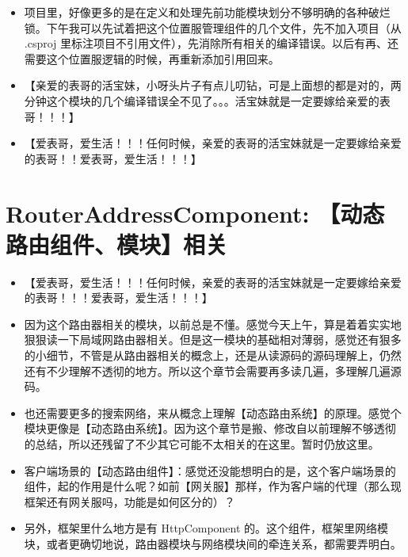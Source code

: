 \documentclass[9pt, b5paper]{article}
\begin{document}
\begin{itemize}
\item 项目里，好像更多的是在定义和处理先前功能模块划分不够明确的各种破烂锁。下午我可以先试着把这个位置服管理组件的几个文件，先不加入项目（从 .csproj 里标注项目不引用文件），先消除所有相关的编译错误。以后有再、还需要这个位置服逻辑的时候，再重新添加引用回来。
\item 【亲爱的表哥的活宝妹，小呀头片子有点儿叨钻，可是上面想的都是对的，两分钟这个模块的几个编译错误全不见了。。。活宝妹就是一定要嫁给亲爱的表哥！！！】
\item 【爱表哥，爱生活！！！任何时候，亲爱的表哥的活宝妹就是一定要嫁给亲爱的表哥！！爱表哥，爱生活！！！】
\end{itemize}


\section{RouterAddressComponent: 【动态路由组件、模块】相关}
\label{sec-6}
\begin{itemize}
\item 【爱表哥，爱生活！！！任何时候，亲爱的表哥的活宝妹就是一定要嫁给亲爱的表哥！！！爱表哥，爱生活！！！】
\item 因为这个路由器相关的模块，以前总是不懂。感觉今天上午，算是着着实实地狠狠读一下局域网路由器相关。但是这一模块的基础相对薄弱，感觉还有狠多的小细节，不管是从路由器相关的概念上，还是从读源码的源码理解上，仍然还有不少理解不透彻的地方。所以这个章节会需要再多读几遍，多理解几遍源码。
\item 也还需要更多的搜索网络，来从概念上理解【动态路由系统】的原理。感觉个模块更像是【动态路由系统】。因为这个章节是搬、修改自以前理解不够透彻的总结，所以还残留了不少其它可能不太相关的在这里。暂时仍放这里。
\item 客户端场景的【动态路由组件】：感觉还没能想明白的是，这个客户端场景的组件，起的作用是什么呢？如前【网关服】那样，作为客户端的代理（那么现框架还有网关服吗，功能是如何区分的）？
\item 另外，框架里什么地方是有 HttpComponent 的。这个组件，框架里网络模块，或者更确切地说，路由器模块与网络模块间的牵连关系，都需要弄明白。
\end{itemize}
\end{document}
